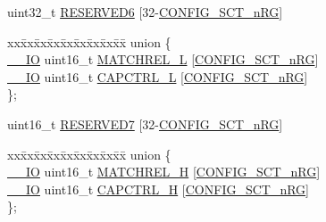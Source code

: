 \begin{DoxyCompactItemize}
\begin{tabbing}
\end{tabbing}\item 
uint32\+\_\+t \hyperlink{struct_l_p_c___s_c_t___t_a9c8a3ab1c41152e3f1630b52dca88f2a}{R\+E\+S\+E\+R\+V\+E\+D6} \mbox{[}32-\/\hyperlink{group___s_c_t__18_x_x__43_x_x_ga8d80e251208a01483a6b00c81ecb7493}{C\+O\+N\+F\+I\+G\+\_\+\+S\+C\+T\+\_\+n\+RG}\mbox{]}
\item 
\begin{tabbing}
xx\=xx\=xx\=xx\=xx\=xx\=xx\=xx\=xx\=\kill
union \{\\
\>\hyperlink{core__sc300_8h_aec43007d9998a0a0e01faede4133d6be}{\_\_IO} uint16\_t \hyperlink{struct_l_p_c___s_c_t___t_a689717cd4ab02bd25e2a8ece35560ed4}{MATCHREL\_L} \mbox{[}\hyperlink{group___s_c_t__18_x_x__43_x_x_ga8d80e251208a01483a6b00c81ecb7493}{CONFIG\_SCT\_nRG}\mbox{]}\\
\>\hyperlink{core__sc300_8h_aec43007d9998a0a0e01faede4133d6be}{\_\_IO} uint16\_t \hyperlink{struct_l_p_c___s_c_t___t_ad5fa6eafb9d9896d4cf1bb5fe35b306c}{CAPCTRL\_L} \mbox{[}\hyperlink{group___s_c_t__18_x_x__43_x_x_ga8d80e251208a01483a6b00c81ecb7493}{CONFIG\_SCT\_nRG}\mbox{]}\\
\}; \\

\end{tabbing}\item 
uint16\+\_\+t \hyperlink{struct_l_p_c___s_c_t___t_a6a6115d67c69f3c355eff2e3f8419874}{R\+E\+S\+E\+R\+V\+E\+D7} \mbox{[}32-\/\hyperlink{group___s_c_t__18_x_x__43_x_x_ga8d80e251208a01483a6b00c81ecb7493}{C\+O\+N\+F\+I\+G\+\_\+\+S\+C\+T\+\_\+n\+RG}\mbox{]}
\item 
\begin{tabbing}
xx\=xx\=xx\=xx\=xx\=xx\=xx\=xx\=xx\=\kill
union \{\\
\>\hyperlink{core__sc300_8h_aec43007d9998a0a0e01faede4133d6be}{\_\_IO} uint16\_t \hyperlink{struct_l_p_c___s_c_t___t_a865ba2ba1895487fe9efbe536c7d3a73}{MATCHREL\_H} \mbox{[}\hyperlink{group___s_c_t__18_x_x__43_x_x_ga8d80e251208a01483a6b00c81ecb7493}{CONFIG\_SCT\_nRG}\mbox{]}\\
\>\hyperlink{core__sc300_8h_aec43007d9998a0a0e01faede4133d6be}{\_\_IO} uint16\_t \hyperlink{struct_l_p_c___s_c_t___t_afa23aca429cb123a2703e765ffcb13f1}{CAPCTRL\_H} \mbox{[}\hyperlink{group___s_c_t__18_x_x__43_x_x_ga8d80e251208a01483a6b00c81ecb7493}{CONFIG\_SCT\_nRG}\mbox{]}\\
\}; \\


\end{tabbing}
\end{DoxyCompactItemize}
